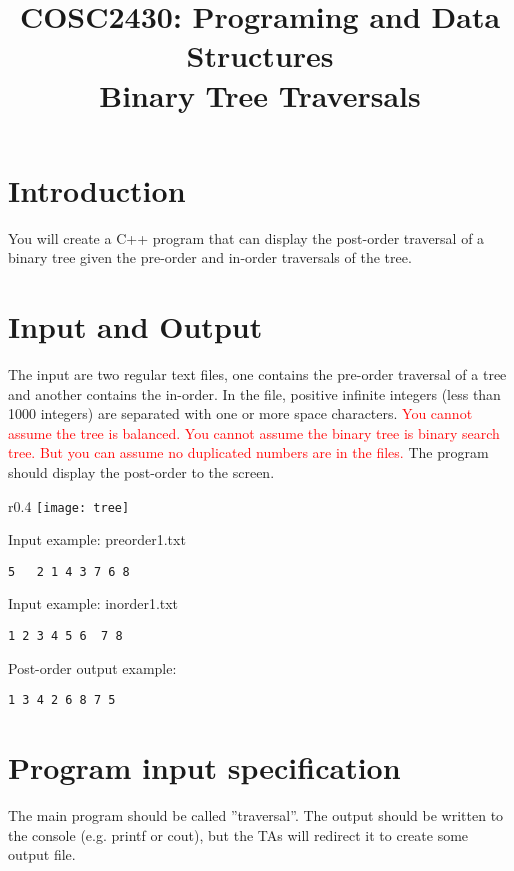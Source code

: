 \documentclass[times,11pt,verbatim,js-singlespace]{article}  %
\title{COSC2430: Programing and Data Structures\\
Binary Tree Traversals
}
\date{}
\begin{document}
\pagestyle{plain}
\let\thepage\relax  %

\maketitle

\section{Introduction}
You will create a C++ program that can display the post-order traversal of a binary tree given the pre-order and in-order traversals of the tree.
\section{Input and Output}
The input are two regular text files, one contains the pre-order traversal of a tree and another contains the in-order. In the file, positive infinite integers (less than 1000 integers) are separated with one or more space characters. \textcolor{red}{You cannot assume the tree is balanced. You cannot assume the binary tree is binary search tree. But you can assume no duplicated numbers are in the files.} The program should display the post-order to the screen. 


\begin{wrapfigure}{r}{0.4\textwidth}
\hspace{-0.2in}
    \texttt{[image: tree]}
\end{wrapfigure}
Input example: preorder1.txt
\begin{verbatim}
5   2 1 4 3 7 6 8
\end{verbatim}
Input example: inorder1.txt
\begin{verbatim}
1 2 3 4 5 6  7 8
\end{verbatim}
Post-order output example:
\begin{verbatim}
1 3 4 2 6 8 7 5
\end{verbatim}

\section{Program input specification}
The main program should be called ”traversal”. The output should be written to the console (e.g.
printf or cout), but the TAs will redirect it to create some output file.
\end{document}
